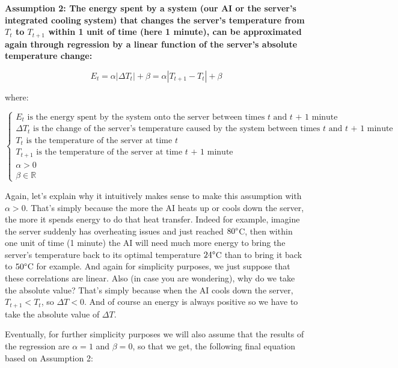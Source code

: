 \documentclass[]{book}
\begin{document}
\textbf{Assumption 2: The energy spent by a system (our AI or the server's integrated cooling system) that changes the server's temperature from $T_t$ to $T_{t+1}$ within 1 unit of time (here 1 minute), can be approximated again through regression by a linear function of the server's absolute temperature change:}

\begin{equation*}
    E_t = \alpha |\Delta T_t| + \beta = \alpha |T_{t+1} - T_t| + \beta
\end{equation*}

where:

\begin{equation*}
\begin{cases}
\textrm{$E_t$ is the energy spent by the system onto the server between times $t$ and $t$ + 1 minute} \\
\textrm{$\Delta T_t$ is the change of the server's temperature caused by the system between times $t$ and $t$ + 1 minute} \\
\textrm{$T_t$ is the temperature of the server at time $t$} \\
\textrm{$T_{t+1}$ is the temperature of the server at time $t$ + 1 minute} \\
\alpha > 0 \\
\beta \in \mathbb{R}
\end{cases}
\end{equation*}

Again, let's explain why it intuitively makes sense to make this assumption with \(\alpha > 0\). That's simply because the more the AI heats up or cools down the server, the more it spends energy to do that heat transfer. Indeed for example, imagine the server suddenly has overheating issues and just reached \(80 \degree\)C, then within one unit of time (1 minute) the AI will need much more energy to bring the server's temperature back to its optimal temperature \(24 \degree\)C than to bring it back to \(50 \degree\)C for example. And again for simplicity purposes, we just suppose that these correlations are linear. Also (in case you are wondering), why do we take the absolute value? That's simply because when the AI cools down the server, \(T_{t+1} < T_t\), so \(\Delta T < 0\). And of course an energy is always positive so we have to take the absolute value of \(\Delta T\).

Eventually, for further simplicity purposes we will also assume that the results of the regression are \(\alpha = 1\) and \(\beta = 0\), so that we get, the following final equation based on Assumption 2:
\end{document}
